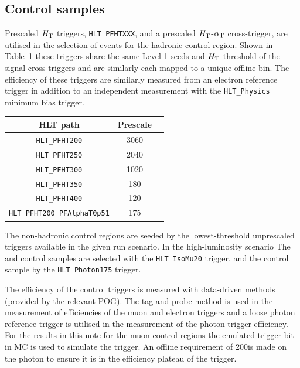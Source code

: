\subsection{Control samples\label{sec:control_samples}}
Prescaled $\mbox{$H_\text{T}$}$ triggers, \verb!HLT_PFHTXXX!, and a prescaled 
$\mbox{$H_\text{T}$}$-$\alpha_{\text{T}}$ cross-trigger, are utilised in the 
selection of events for the hadronic control region. Shown 
in Table~\ref{tab:2015_Hadronic_Control_Triggers} these triggers share the same Level-1 
seeds and $\mbox{$H_\text{T}$}$ threshold of the signal cross-triggers and are similarly each mapped 
to a unique offline bin. The efficiency of these triggers are similarly measured from an electron 
reference trigger in addition to an independent measurement with the \verb!HLT_Physics! 
minimum bias trigger.


\begin{table}[h!]
\footnotesize
\centering
\begin{tabular}{c|cc} 
\hline
\hline
HLT path & \multicolumn{1}{c}{Prescale} \\
\hline
\texttt{HLT\_PFHT200} & 3060 \\
\texttt{HLT\_PFHT250} & 2040 \\
\texttt{HLT\_PFHT300} & 1020 \\
\texttt{HLT\_PFHT350} & 180  \\
\texttt{HLT\_PFHT400} & 120  \\
\texttt{HLT\_PFHT200\_PFAlphaT0p51} & 175 \\
\hline
\hline

\end{tabular}
\label{tab:2015_Hadronic_Control_Triggers}
\end{table}


The non-hadronic control regions are seeded by the lowest-threshold unprescaled 
triggers available in the given run scenario. In the high-luminosity scenario The 
\mj and \mmj control samples are selected with the \verb!HLT_IsoMu20! trigger,
and the \gj control sample by the \verb!HLT_Photon175! trigger. 

The efficiency of the control triggers is measured with data-driven methods
(provided by the relevant POG). The tag and probe method is used in the measurement of
efficiencies of the muon and electron triggers and a loose photon reference trigger 
is utilised in the measurement of the photon trigger efficiency. For the results in 
this note for the muon control regions the emulated trigger bit in MC is used to simulate 
the trigger. An offline \Pt requirement of 200\GeV is made on the photon
to ensure it is in the efficiency plateau of the trigger.



